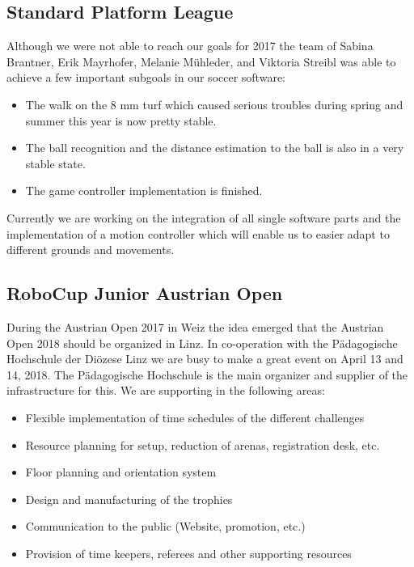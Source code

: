 \documentclass[11pt]{article}
\begin{document}
\subsection{Standard Platform League}\label{sec:spl}
Although we were not able to reach our goals for 2017 the team of Sabina Brantner, Erik Mayrhofer, Melanie Mühleder, and Viktoria Streibl was able to achieve a few important subgoals in our soccer software:

\begin{itemize}
	\item The walk on the 8 mm turf which caused serious troubles during spring and summer this year is now pretty stable. 
	\item The ball recognition and the distance estimation to the ball is also in a very stable state.
	\item The game controller implementation is finished.
\end{itemize}

Currently we are working on the integration of all single software parts and the implementation of a motion controller which will enable us to easier adapt to different grounds and movements.

\subsection{RoboCup Junior Austrian Open}\label{sec:rcj}
During the Austrian Open 2017 in Weiz the idea emerged that the Austrian Open 2018 should be organized in Linz. In co-operation with the Pädagogische Hochschule der Diözese Linz we are busy to make a great event on April 13 and 14, 2018. The Pädagogische Hochschule is the main organizer and supplier of the infrastructure for this. We are supporting in the following areas:

\begin{itemize}
	\item Flexible implementation of time schedules of the different challenges
	\item Resource planning for setup, reduction of arenas, registration desk, etc.
	\item Floor planning and orientation system
	\item Design and manufacturing of the trophies
	\item Communication to the public (Website, promotion, etc.)
	\item Provision of time keepers, referees and other supporting resources
\end{itemize}
\end{document}
